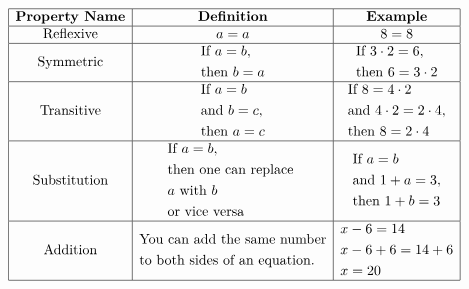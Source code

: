 \[
\begin{array}{|c|c|c|}
\hline
\textbf{Property Name} & \textbf{Definition} & \textbf{Example} \\ \hline

\text{Reflexive} & a = a & 8 = 8 \\ \hline

\text{Symmetric} &
\begin{aligned}
&\text{If } a = b,\\
&\text{then } b = a
\end{aligned}
&
\begin{aligned}
&\text{If } 3\cdot 2 = 6,\\
&\text{then } 6 = 3\cdot 2
\end{aligned}
\\ \hline

\text{Transitive} &
\begin{aligned}
&\text{If } a = b\\
&\text{and } b = c,\\
&\text{then } a = c
\end{aligned}
&
\begin{aligned}
&\text{If } 8 = 4\cdot 2\\
&\text{and } 4\cdot 2 = 2\cdot 4,\\
&\text{then } 8 = 2\cdot 4
\end{aligned}
\\ \hline

\text{Substitution} &
\begin{aligned}
&\text{If } a = b,\\
&\text{then one can replace }\\
&a \text{ with } b\\
&\text{or vice versa}
\end{aligned}
&
\begin{aligned}
&\text{If } a = b\\
&\text{and } 1 + a = 3,\\
&\text{then } 1 + b = 3
\end{aligned}
\\ \hline

\text{Addition} &
\begin{aligned}
&\text{You can add the same number}\\
&\text{to both sides of an equation.}
\end{aligned}
&
\begin{aligned}
&x - 6 = 14\\
&x - 6 + 6 = 14 + 6\\
&x = 20
\end{aligned}
\\ \hline


\end{array}\]
